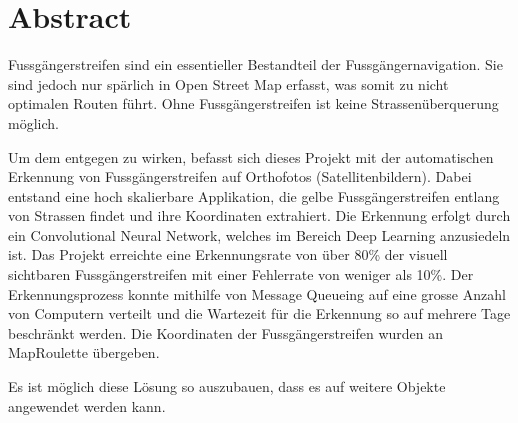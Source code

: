\section{Abstract}

Fussgängerstreifen sind ein essentieller Bestandteil der Fussgängernavigation. Sie sind jedoch nur spärlich in Open Street Map erfasst, was somit zu nicht optimalen Routen führt. Ohne Fussgängerstreifen ist keine Strassenüberquerung möglich.

Um dem entgegen zu wirken,  befasst sich dieses Projekt mit der automatischen Erkennung von Fussgängerstreifen auf Orthofotos (Satellitenbildern). 
Dabei entstand eine hoch skalierbare Applikation, die gelbe Fussgängerstreifen entlang von Strassen findet und ihre Koordinaten extrahiert. Die Erkennung erfolgt durch ein Convolutional Neural Network, welches im Bereich Deep Learning anzusiedeln ist.
Das Projekt erreichte eine Erkennungsrate von über 80\% der visuell sichtbaren Fussgängerstreifen mit einer Fehlerrate von weniger als 10\%. Der Erkennungsprozess konnte mithilfe von Message Queueing auf eine grosse Anzahl von Computern verteilt und die Wartezeit für die Erkennung so auf mehrere Tage beschränkt werden. Die Koordinaten der Fussgängerstreifen wurden an MapRoulette übergeben.

Es ist möglich diese Lösung so auszubauen, dass es auf weitere Objekte angewendet werden kann.
